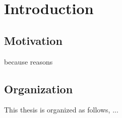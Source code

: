 \chapter{Introduction}
\section{Motivation}
because reasons
\section{Organization}
This thesis is organized as follows, ...